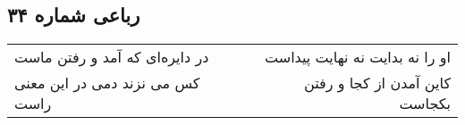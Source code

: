 \begin{center}
\section*{رباعی شماره ۳۴}
\label{sec:sh034}
\begin{longtable}{l p{0.5cm} r}
در دایره‌ای که آمد و رفتن ماست
&&
او را نه بدایت نه نهایت پیداست
\\
کس می نزند دمی در این معنی راست
&&
کاین آمدن از کجا و رفتن بکجاست
\\
\end{longtable}
\end{center}
